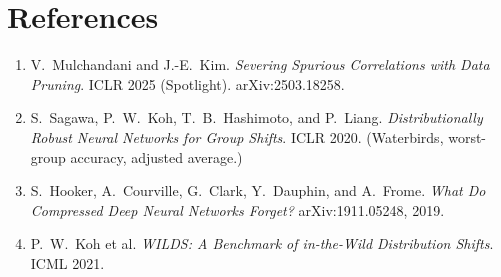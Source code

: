 \documentclass[11pt]{article}
\begin{document}
\section*{References}

\begin{enumerate}[leftmargin=1.6em]
\item V.\ Mulchandani and J.-E.\ Kim. \emph{Severing Spurious Correlations with
Data Pruning}. ICLR 2025 (Spotlight). arXiv:2503.18258.
\item S.\ Sagawa, P.\ W.\ Koh, T.\ B.\ Hashimoto, and P.\ Liang.
\emph{Distributionally Robust Neural Networks for Group Shifts}. ICLR 2020.
(Waterbirds, worst-group accuracy, adjusted average.)
\item S.\ Hooker, A.\ Courville, G.\ Clark, Y.\ Dauphin, and A.\ Frome.
\emph{What Do Compressed Deep Neural Networks Forget?} arXiv:1911.05248, 2019.
\item P.\ W.\ Koh et al. \emph{WILDS: A Benchmark of in-the-Wild Distribution
Shifts}. ICML 2021.
\end{enumerate}
\end{document}
